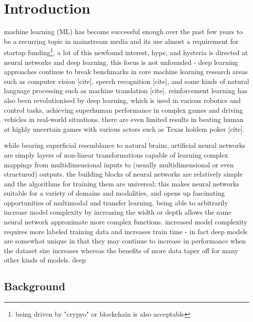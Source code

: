 \chapter{Introduction}


machine learning (ML) has become successful enough  over the past few years to be a recurring topic in mainstream media and its use almost a requirement for startup funding\footnote{being driven by "crypyo" or blockchain is also acceptable}.
a lot of this newfound interest, hype, and hysteria is directed at  neural networks and deep learning. this focus is not unfounded - deep learning approaches continue to break benchmarks in  core machine learning research areas such as computer vision [cite], speech recognition [cite], and  some kinds of natural language processing  such as machine translation [cite].
reinforcement learning has also been revolutionised by deep learning, which is used in various robotics and control tasks, achieving superhuman performance in complex games and driving vehicles in real-world situations.
there are even limited results in  beating human at highly uncertain games with various actors such as Texas holdem poker [cite].

while bearing superficial resemblance to  natural brains, artificial neural networks are simply layers of non-linear transformations  capable of learning complex mappings from multidimensional inputs to (usually multidimensional or even structured) outputs.
the building blocks of neural networks are relatively simple and the algorithms for training them are universal; this makes neural networks suitable for a variety of domains and modalities, and opens up fascinating opportunities of multimodal and transfer learning.
being able to arbitrarily increase model complexity by increasing the width or depth allows the same neural network approximate more complex functions.
increased model complexity requires more labeled training data and increases train time - in fact deep models are somewhat unique in that they may continue to increase in performance when the dataset size increases whereas the benefits of more data taper off for many other kinds of models.
deep

\section{Background}
